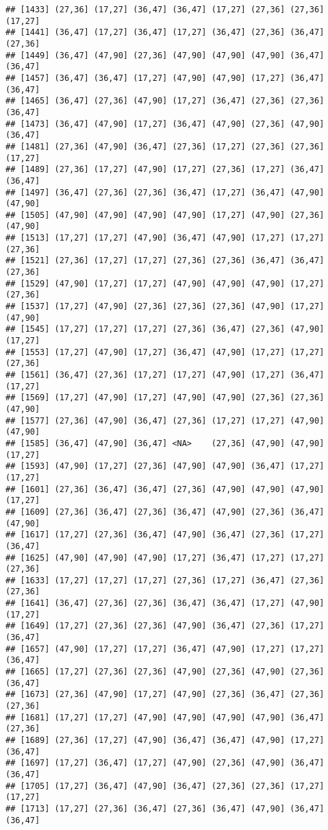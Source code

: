 \documentclass[12pt,]{article}
\begin{document}
\begin{verbatim}
## [1433] (27,36] (17,27] (36,47] (36,47] (17,27] (27,36] (27,36] (17,27]
## [1441] (36,47] (17,27] (36,47] (17,27] (36,47] (27,36] (36,47] (27,36]
## [1449] (36,47] (47,90] (27,36] (47,90] (47,90] (47,90] (36,47] (36,47]
## [1457] (36,47] (36,47] (17,27] (47,90] (47,90] (17,27] (36,47] (36,47]
## [1465] (36,47] (27,36] (47,90] (17,27] (36,47] (27,36] (27,36] (36,47]
## [1473] (36,47] (47,90] (17,27] (36,47] (47,90] (27,36] (47,90] (36,47]
## [1481] (27,36] (47,90] (36,47] (27,36] (17,27] (27,36] (27,36] (17,27]
## [1489] (27,36] (17,27] (47,90] (17,27] (27,36] (17,27] (36,47] (36,47]
## [1497] (36,47] (27,36] (27,36] (36,47] (17,27] (36,47] (47,90] (47,90]
## [1505] (47,90] (47,90] (47,90] (47,90] (17,27] (47,90] (27,36] (47,90]
## [1513] (17,27] (17,27] (47,90] (36,47] (47,90] (17,27] (17,27] (27,36]
## [1521] (27,36] (17,27] (17,27] (27,36] (27,36] (36,47] (36,47] (27,36]
## [1529] (47,90] (17,27] (17,27] (47,90] (47,90] (47,90] (17,27] (27,36]
## [1537] (17,27] (47,90] (27,36] (27,36] (27,36] (47,90] (17,27] (47,90]
## [1545] (17,27] (17,27] (17,27] (27,36] (36,47] (27,36] (47,90] (17,27]
## [1553] (17,27] (47,90] (17,27] (36,47] (47,90] (17,27] (17,27] (27,36]
## [1561] (36,47] (27,36] (17,27] (17,27] (47,90] (17,27] (36,47] (17,27]
## [1569] (17,27] (47,90] (17,27] (47,90] (47,90] (27,36] (27,36] (47,90]
## [1577] (27,36] (47,90] (36,47] (27,36] (17,27] (17,27] (47,90] (47,90]
## [1585] (36,47] (47,90] (36,47] <NA>    (27,36] (47,90] (47,90] (17,27]
## [1593] (47,90] (17,27] (27,36] (47,90] (47,90] (36,47] (17,27] (17,27]
## [1601] (27,36] (36,47] (36,47] (27,36] (47,90] (47,90] (47,90] (17,27]
## [1609] (27,36] (36,47] (27,36] (36,47] (47,90] (27,36] (36,47] (47,90]
## [1617] (17,27] (27,36] (36,47] (47,90] (36,47] (27,36] (17,27] (36,47]
## [1625] (47,90] (47,90] (47,90] (17,27] (36,47] (17,27] (17,27] (27,36]
## [1633] (17,27] (17,27] (17,27] (27,36] (17,27] (36,47] (27,36] (27,36]
## [1641] (36,47] (27,36] (27,36] (36,47] (36,47] (17,27] (47,90] (17,27]
## [1649] (17,27] (27,36] (27,36] (47,90] (36,47] (27,36] (17,27] (36,47]
## [1657] (47,90] (17,27] (17,27] (36,47] (47,90] (17,27] (17,27] (36,47]
## [1665] (17,27] (27,36] (27,36] (47,90] (27,36] (47,90] (27,36] (36,47]
## [1673] (27,36] (47,90] (17,27] (47,90] (27,36] (36,47] (27,36] (27,36]
## [1681] (17,27] (17,27] (47,90] (47,90] (47,90] (47,90] (36,47] (27,36]
## [1689] (27,36] (17,27] (47,90] (36,47] (36,47] (47,90] (17,27] (36,47]
## [1697] (17,27] (36,47] (17,27] (47,90] (27,36] (47,90] (36,47] (36,47]
## [1705] (17,27] (36,47] (47,90] (36,47] (27,36] (27,36] (17,27] (17,27]
## [1713] (17,27] (27,36] (36,47] (27,36] (36,47] (47,90] (36,47] (36,47]

\end{verbatim}
\end{document}
